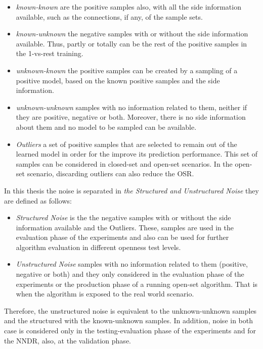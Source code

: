 \begin{itemize}
    \item \textit{known-known} are the positive samples also, with all the side information available, such as the connections, if any, of the sample sets.
    \item \textit{known-unknown} the negative samples with or without the side information available. Thus, partly or totally can be the rest of the positive samples in the 1-vs-rest training.
    \item \textit{unknown-known} the positive samples can be created by a sampling of a positive model, based on the known positive samples and the side information.
    \item \textit{unknown-unknown} samples with no information related to them, neither if they are positive, negative or both. Moreover, there is no side information about them and no model to be sampled can be available. 
    \item \textit{Outliers} a set of positive samples that are selected to remain out of the learned model in order for the improve its prediction performance. This set of samples can be considered in closed-set and open-set scenarios. In the open-set scenario, discarding outliers can also reduce the OSR.
\end{itemize}


In this thesis the noise is separated in \textit{the Structured and Unstructured Noise} they are defined as follows:

\begin{itemize}
    \item \textit{Structured Noise} is the the negative samples with or without the side information available and the Outliers. These, samples are used in the evaluation phase of the experiments and also can be used for further algorithm evaluation in different openness test levels.
    \item \textit{Unstructured Noise} samples with no information related to them (positive, negative or both) and they only considered in the evaluation phase of the experiments or the production phase of a running open-set algorithm. That is when the algorithm is exposed to the real world scenario.
\end{itemize}


Therefore, the unstructured noise is equivalent to the unknown-unknown samples and the structured with the known-unknown samples. In addition, noise in both case is considered only in the testing-evaluation phase of the experiments and for the NNDR, also, at the validation phase.



